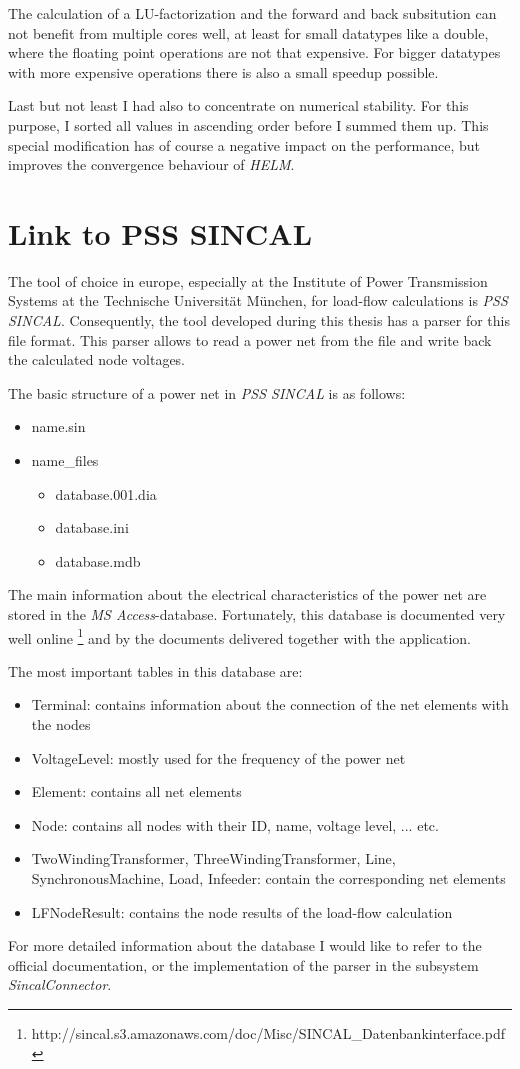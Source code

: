 The calculation of a LU-factorization and the forward and back subsitution can not benefit from multiple cores well, at least for small datatypes like a double, where the floating point operations are not that expensive. For bigger datatypes with more expensive operations there is also a small speedup possible.

Last but not least I had also to concentrate on numerical stability. For this purpose, I sorted all values in ascending order before I summed them up. This special modification has of course a negative impact on the performance, but improves the convergence behaviour of \emph{HELM}.

\section{Link to PSS SINCAL}
\label{sec:link_sincal}
The tool of choice in europe, especially at the Institute of Power Transmission Systems at the Technische Universität München, for load-flow calculations is \emph{PSS SINCAL}. Consequently, the tool developed during this thesis has a parser for this file format. This parser allows to read a power net from the file and write back the calculated node voltages.

The basic structure of a power net in \emph{PSS SINCAL} is as follows:
\begin{itemize}
	\item {\textlangle}name{\textrangle}.sin
	\item {\textlangle}name{\textrangle\_}files
	\begin{itemize}
		\item database.001.dia
		\item database.ini
		\item database.mdb
	\end{itemize}
\end{itemize}

The main information about the electrical characteristics of the power net are stored in the \emph{MS Access}-database. Fortunately, this database is documented very well online \footnote{http://sincal.s3.amazonaws.com/doc/Misc/SINCAL\_Datenbankinterface.pdf} and by the documents delivered together with the application.

The most important tables in this database are:
\begin{itemize}
	\item Terminal: contains information about the connection of the net elements with the nodes
	\item VoltageLevel: mostly used for the frequency of the power net
	\item Element: contains all net elements
	\item Node: contains all nodes with their ID, name, voltage level, ... etc.
	\item TwoWindingTransformer, ThreeWindingTransformer, Line, SynchronousMachine, Load, Infeeder: contain the corresponding net elements
	\item LFNodeResult: contains the node results of the load-flow calculation
\end{itemize}

For more detailed information about the database I would like to refer to the official documentation, or the implementation of the parser in the subsystem \emph{SincalConnector}.